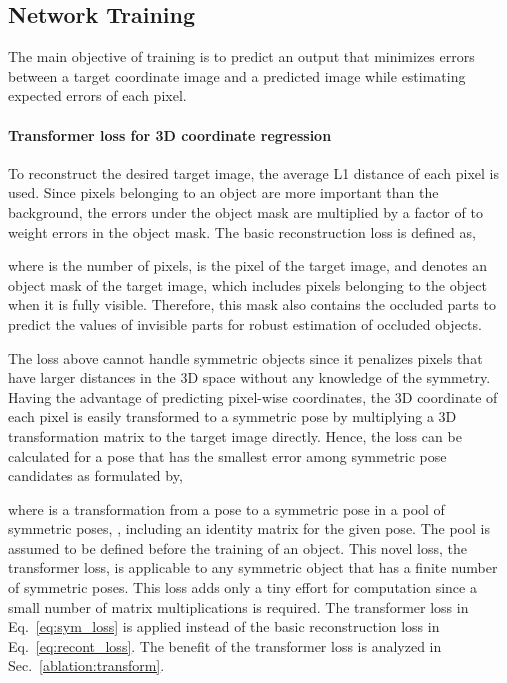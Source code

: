 \documentclass[10pt,twocolumn,letterpaper]{article}
\begin{document}
\subsection{Network Training}


The main objective of training is to predict an output that minimizes errors between a target coordinate image and a predicted image while estimating expected errors of each pixel.


\paragraph{Transformer loss for 3D coordinate regression} \label{transformer}
To reconstruct the desired target image, the average L1 distance of each pixel is used. Since pixels belonging to an object are more important than the background, the errors under the object mask are multiplied by a factor of  to weight errors in the object mask. The basic reconstruction loss  is defined as,
 
where  is the number of pixels,  is the  pixel of the target image, and  denotes an object mask of the target image, which includes pixels belonging to the object when it is fully visible. Therefore, this mask also contains the occluded parts to predict the values of invisible parts for robust estimation of occluded objects.

The loss above cannot handle symmetric objects since it penalizes pixels that have larger distances in the 3D space without any knowledge of the symmetry. Having the advantage of predicting pixel-wise coordinates, the 3D coordinate of each pixel is easily transformed to a symmetric pose by multiplying a 3D transformation matrix to the target image directly. Hence, the loss can be calculated for a pose that has the smallest error among symmetric pose candidates as formulated by, 
 
where  is a transformation from a pose to a symmetric pose in a pool of symmetric poses, , including an identity matrix for the given pose. The pool  is assumed to be defined before the training of an object. This novel loss, the transformer loss, is applicable to any symmetric object that has a finite number of symmetric poses. This loss adds only a tiny effort for computation since a small number of matrix multiplications is required. The transformer loss in Eq.~\ref{eq:sym_loss} is applied instead of the basic reconstruction loss in Eq.~\ref{eq:recont_loss}. The benefit of the transformer loss is analyzed in Sec.~\ref{ablation:transform}. 
\end{document}
